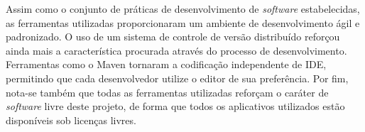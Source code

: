 Assim como o conjunto de práticas de desenvolvimento de \emph{software} estabelecidas, as ferramentas utilizadas proporcionaram um ambiente de desenvolvimento ágil e padronizado.
O uso de um sistema de controle de versão distribuído reforçou ainda mais a característica procurada através do processo de desenvolvimento.
Ferramentas como o Maven tornaram a codificação independente de IDE, permitindo que cada desenvolvedor utilize o editor de sua preferência.
Por fim, nota-se também que todas as ferramentas utilizadas reforçam o caráter de \emph{software} livre deste projeto, de forma que todos os aplicativos utilizados estão disponíveis sob licenças livres. 
